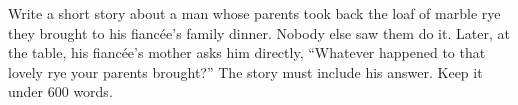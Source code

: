 Write a short story about a man whose parents took back the loaf of marble rye they brought to his fianc\'ee's family dinner. Nobody else saw them do it. Later, at the table, his fianc\'ee's mother asks him directly, ``Whatever happened to that lovely rye your parents brought?'' The story must include his answer. Keep it under 600 words.
